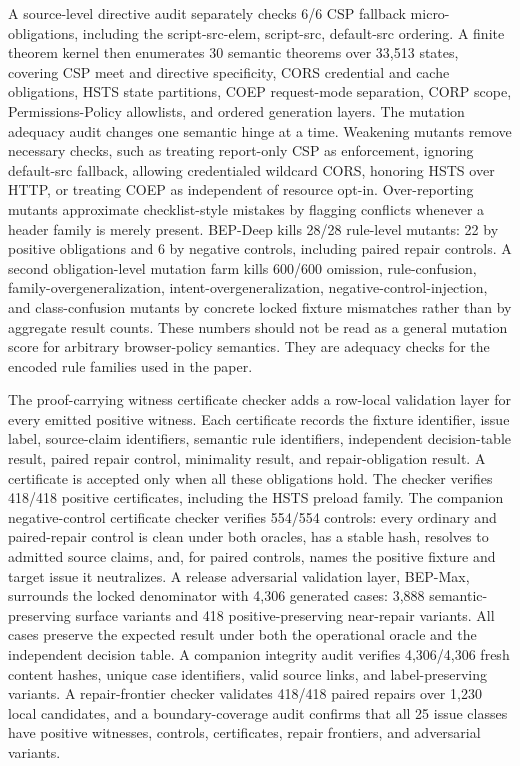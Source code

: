 \documentclass[10pt,conference]{IEEEtran}
\begin{document}
A source-level directive audit separately checks 6/6 CSP fallback micro-obligations, including the script-src-elem, script-src, default-src ordering. A finite theorem kernel then enumerates 30 semantic theorems over 33,513 states, covering CSP meet and directive specificity, CORS credential and cache obligations, HSTS state partitions, COEP request-mode separation, CORP scope, Permissions-Policy allowlists, and ordered generation layers. The mutation adequacy audit changes one semantic hinge at a time.  Weakening mutants remove necessary checks, such as treating report-only CSP as enforcement, ignoring default-src fallback, allowing credentialed wildcard CORS, honoring HSTS over HTTP, or treating COEP as independent of resource opt-in.  Over-reporting mutants approximate checklist-style mistakes by flagging conflicts whenever a header family is merely present.  BEP-Deep kills 28/28 rule-level mutants: 22 by positive obligations and 6 by negative controls, including paired repair controls.  A second obligation-level mutation farm kills 600/600 omission, rule-confusion, family-overgeneralization, intent-overgeneralization, negative-control-injection, and class-confusion mutants by concrete locked fixture mismatches rather than by aggregate result counts. These numbers should not be read as a general mutation score for arbitrary browser-policy semantics.  They are adequacy checks for the encoded rule families used in the paper.

The proof-carrying witness certificate checker adds a row-local validation layer for every emitted positive witness. Each certificate records the fixture identifier, issue label, source-claim identifiers, semantic rule identifiers, independent decision-table result, paired repair control, minimality result, and repair-obligation result. A certificate is accepted only when all these obligations hold. The checker verifies 418/418 positive certificates, including the HSTS preload family.  The companion negative-control certificate checker verifies 554/554 controls: every ordinary and paired-repair control is clean under both oracles, has a stable hash, resolves to admitted source claims, and, for paired controls, names the positive fixture and target issue it neutralizes. A release adversarial validation layer, BEP-Max, surrounds the locked denominator with 4,306 generated cases: 3,888 semantic-preserving surface variants and 418 positive-preserving near-repair variants. All cases preserve the expected result under both the operational oracle and the independent decision table. A companion integrity audit verifies 4,306/4,306 fresh content hashes, unique case identifiers, valid source links, and label-preserving variants. A repair-frontier checker validates 418/418 paired repairs over 1,230 local candidates, and a boundary-coverage audit confirms that all 25 issue classes have positive witnesses, controls, certificates, repair frontiers, and adversarial variants.
\end{document}
